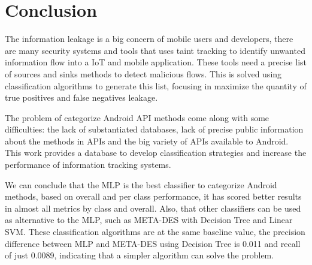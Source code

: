 \chapter{Conclusion}\label{chapter:conclusion}

The information leakage is a big concern of mobile users and developers, there are many security systems and tools that uses taint tracking to identify unwanted information flow into a IoT and mobile application. These tools need a precise list of sources and sinks methods to detect malicious flows. This is solved using classification algorithms to generate this list, focusing in maximize the quantity of true positives and false negatives leakage.

The problem of categorize Android API methods come along with some difficulties: the lack of substantiated databases, lack of precise public information about the methods in APIs and the big variety of APIs available to Android. This work provides a database to develop classification strategies and increase the performance of information tracking systems.

We can conclude that the MLP is the best classifier to categorize Android methods, based on overall and per class performance, it has scored better results in almost all metrics by class and overall. Also, that other classifiers can be used as alternative to the MLP, such as META-DES with Decision Tree and Linear SVM. These classification algorithms are at the same baseline value, the precision difference between MLP and META-DES using Decision Tree is 0.011 and recall of just 0.0089, indicating that a simpler algorithm can solve the problem.
